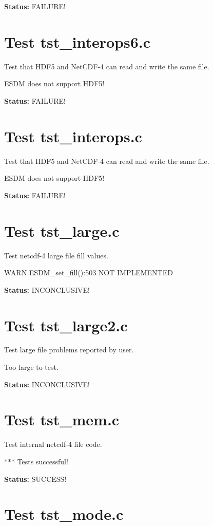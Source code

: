{\bf \large Status: } FAILURE!

\section{Test tst\_interops6.c}

Test that HDF5 and NetCDF-4 can read and write the same file.

ESDM does not support HDF5!

{\bf \large Status: } FAILURE!

\section{Test tst\_interops.c}

Test that HDF5 and NetCDF-4 can read and write the same file.

ESDM does not support HDF5!

{\bf \large Status: } FAILURE!

\section{Test tst\_large.c}

Test netcdf-4 large file fill values.

WARN ESDM\_set\_fill():503 NOT IMPLEMENTED

{\bf \large Status: } INCONCLUSIVE!

\section{Test tst\_large2.c}

Test large file problems reported by user.

Too large to test.

{\bf \large Status: } INCONCLUSIVE!

\section{Test tst\_mem.c}

Test internal netcdf-4 file code.

*** Tests successful!

{\bf \large Status: } SUCCESS!

\section{Test tst\_mode.c}


